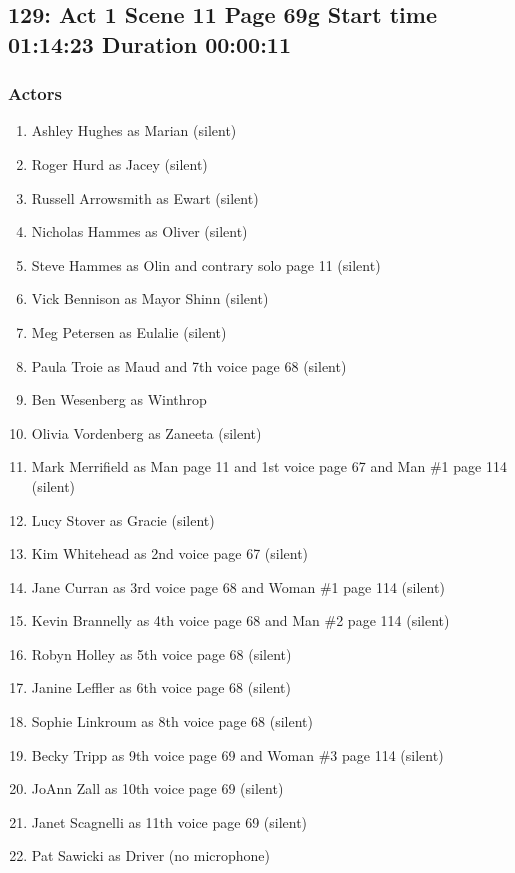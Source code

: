 \subsection{129: Act 1 Scene 11 Page 69g Start time 01:14:23 Duration 00:00:11}

\subsubsection{Actors}
\begin{enumerate}
\item Ashley Hughes as Marian (silent)
\item Roger Hurd as Jacey (silent)
\item Russell Arrowsmith as Ewart (silent)
\item Nicholas Hammes as Oliver (silent)
\item Steve Hammes as Olin and contrary solo page 11 (silent)
\item Vick Bennison as Mayor Shinn (silent)
\item Meg Petersen as Eulalie (silent)
\item Paula Troie as Maud and 7th voice page 68 (silent)
\item Ben Wesenberg as Winthrop
\item Olivia Vordenberg as Zaneeta (silent)
\item Mark Merrifield as Man page 11 and 1st voice page 67 and Man \#1 page 114 (silent)
\item Lucy Stover as Gracie (silent)
\item Kim Whitehead as 2nd voice page 67 (silent)
\item Jane Curran as 3rd voice page 68 and Woman \#1 page 114 (silent)
\item Kevin Brannelly as 4th voice page 68 and Man \#2 page 114 (silent)
\item Robyn Holley as 5th voice page 68 (silent)
\item Janine Leffler as 6th voice page 68 (silent)
\item Sophie Linkroum as 8th voice page 68 (silent)
\item Becky Tripp as 9th voice page 69 and Woman \#3 page 114 (silent)
\item JoAnn Zall as 10th voice page 69 (silent)
\item Janet Scagnelli as 11th voice page 69 (silent)
\item Pat Sawicki as Driver (no microphone)
\end{enumerate}

